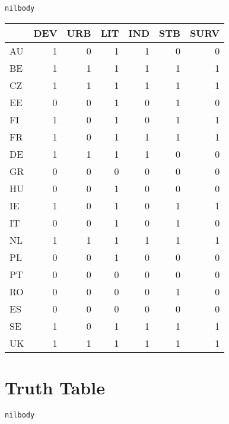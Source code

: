 \documentclass[11pt]{article}
\begin{document}
\begin{verbatim}
nilbody
\end{verbatim}


\begin{tabular}{l|r|r|r|r|r|r}
\hline
  & DEV & URB & LIT & IND & STB & SURV\\
\hline
AU & 1 & 0 & 1 & 1 & 0 & 0\\
\hline
BE & 1 & 1 & 1 & 1 & 1 & 1\\
\hline
CZ & 1 & 1 & 1 & 1 & 1 & 1\\
\hline
EE & 0 & 0 & 1 & 0 & 1 & 0\\
\hline
FI & 1 & 0 & 1 & 0 & 1 & 1\\
\hline
FR & 1 & 0 & 1 & 1 & 1 & 1\\
\hline
DE & 1 & 1 & 1 & 1 & 0 & 0\\
\hline
GR & 0 & 0 & 0 & 0 & 0 & 0\\
\hline
HU & 0 & 0 & 1 & 0 & 0 & 0\\
\hline
IE & 1 & 0 & 1 & 0 & 1 & 1\\
\hline
IT & 0 & 0 & 1 & 0 & 1 & 0\\
\hline
NL & 1 & 1 & 1 & 1 & 1 & 1\\
\hline
PL & 0 & 0 & 1 & 0 & 0 & 0\\
\hline
PT & 0 & 0 & 0 & 0 & 0 & 0\\
\hline
RO & 0 & 0 & 0 & 0 & 1 & 0\\
\hline
ES & 0 & 0 & 0 & 0 & 0 & 0\\
\hline
SE & 1 & 0 & 1 & 1 & 1 & 1\\
\hline
UK & 1 & 1 & 1 & 1 & 1 & 1\\
\hline
\end{tabular}
\section*{Truth Table}
\label{sec:org047e59b}

\begin{verbatim}
nilbody
\end{verbatim}
\end{document}
